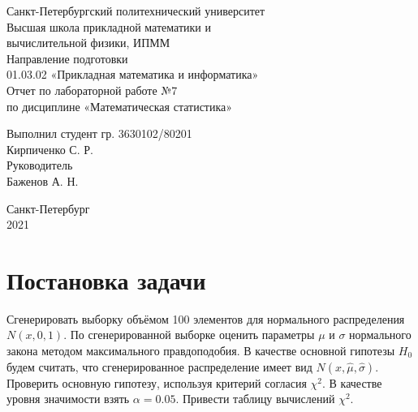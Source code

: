 \documentclass[a4paper,12pt]{article} %
\begin{document}

\large
\begin{center}
    Санкт-Петербургский политехнический университет\\
    Высшая школа прикладной математики и\\вычислительной физики, ИПММ\\
    \vspace{5em}
    Направление подготовки\\
    01.03.02 «Прикладная математика и информатика»\\
    \vspace{3em}
    Отчет по лабораторной работе №7\\
    по дисциплине «Математическая статистика»
    \vspace{15em}
\end{center}
Выполнил студент гр. 3630102/80201\\
Кирпиченко С. Р.\\
Руководитель\\
Баженов А. Н.
\vspace{7em}
\begin{center}
    Санкт-Петербург\\
    2021
\end{center}
\thispagestyle{empty}
\newpage
\tableofcontents
{}
\newpage
\listoftables
{}
\thispagestyle{empty}
\newpage
\section{Постановка задачи}
Сгенерировать выборку объёмом 100 элементов для нормального распределения $N(x,0,1)$. По сгенерированной выборке оценить параметры $\mu$ и $\sigma$ нормального закона методом максимального правдоподобия.
В качестве основной гипотезы $H_0$ будем считать, что сгенерированное
распределение имеет вид $N(x,\hat{\mu},\hat{\sigma})$. Проверить основную гипотезу, используя критерий согласия $\chi^2$. В качестве уровня значимости взять $\alpha=0.05$. Привести таблицу вычислений $\chi^2$.
\end{document}
